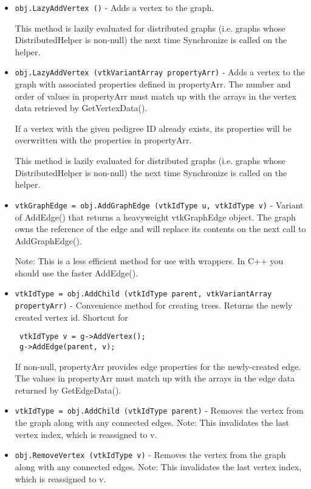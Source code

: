 \begin{itemize}
\item  \verb|obj.LazyAddVertex ()| -  Adds a vertex to the graph.
 
 This method is lazily evaluated for distributed graphs (i.e. graphs
 whose DistributedHelper is non-null) the next time Synchronize is
 called on the helper.

\item  \verb|obj.LazyAddVertex (vtkVariantArray propertyArr)| -  Adds a vertex to the graph with associated properties defined in
  propertyArr.
 The number and order of values in  propertyArr must match up with the
 arrays in the vertex data retrieved by GetVertexData().
 
 If a vertex with the given pedigree ID already exists, its properties will be
 overwritten with the properties in  propertyArr.
 
 This method is lazily evaluated for distributed graphs (i.e. graphs
 whose DistributedHelper is non-null) the next time Synchronize is
 called on the helper.

\item  \verb|vtkGraphEdge = obj.AddGraphEdge (vtkIdType u, vtkIdType v)| -  Variant of AddEdge() that returns a heavyweight  vtkGraphEdge object.
 The graph owns the reference of the edge and will replace
 its contents on the next call to AddGraphEdge().
 
 Note: This is a less efficient method for use with wrappers.
 In C++ you should use the faster AddEdge().

\item  \verb|vtkIdType = obj.AddChild (vtkIdType parent, vtkVariantArray propertyArr)| -  Convenience method for creating trees.
 Returns the newly created vertex id.
 Shortcut for
 \begin{verbatim}
 vtkIdType v = g->AddVertex();
 g->AddEdge(parent, v);
 \end{verbatim}
 If non-null,  propertyArr provides edge properties
 for the newly-created edge. The values in  propertyArr must match
 up with the arrays in the edge data returned by GetEdgeData().

\item  \verb|vtkIdType = obj.AddChild (vtkIdType parent)| -  Removes the vertex from the graph along with any connected edges.
 Note: This invalidates the last vertex index, which is reassigned to v.

\item  \verb|obj.RemoveVertex (vtkIdType v)| -  Removes the vertex from the graph along with any connected edges.
 Note: This invalidates the last vertex index, which is reassigned to v.


\end{itemize}
